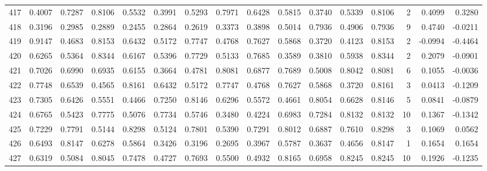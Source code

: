 \begin{tabular}{lrrrrrrrrrrrrrrr}
417 &      0.4007 &  0.7287 &  0.8106 &  0.5532 &  0.3991 &  0.5293 &  0.7971 &  0.6428 &  0.5815 &  0.3740 &   0.5339 &     0.8106 &      2 &                    0.4099 &                     0.3280 \\
418 &      0.3196 &  0.2985 &  0.2889 &  0.2455 &  0.2864 &  0.2619 &  0.3373 &  0.3898 &  0.5014 &  0.7936 &   0.4906 &     0.7936 &      9 &                    0.4740 &                    -0.0211 \\
419 &      0.9147 &  0.4683 &  0.8153 &  0.6432 &  0.5172 &  0.7747 &  0.4768 &  0.7627 &  0.5868 &  0.3720 &   0.4123 &     0.8153 &      2 &                   -0.0994 &                    -0.4464 \\
420 &      0.6265 &  0.5364 &  0.8344 &  0.6167 &  0.5396 &  0.7729 &  0.5133 &  0.7685 &  0.3589 &  0.3810 &   0.5938 &     0.8344 &      2 &                    0.2079 &                    -0.0901 \\
421 &      0.7026 &  0.6990 &  0.6935 &  0.6155 &  0.3664 &  0.4781 &  0.8081 &  0.6877 &  0.7689 &  0.5008 &   0.8042 &     0.8081 &      6 &                    0.1055 &                    -0.0036 \\
422 &      0.7748 &  0.6539 &  0.4565 &  0.8161 &  0.6432 &  0.5172 &  0.7747 &  0.4768 &  0.7627 &  0.5868 &   0.3720 &     0.8161 &      3 &                    0.0413 &                    -0.1209 \\
423 &      0.7305 &  0.6426 &  0.5551 &  0.4466 &  0.7250 &  0.8146 &  0.6296 &  0.5572 &  0.4661 &  0.8054 &   0.6628 &     0.8146 &      5 &                    0.0841 &                    -0.0879 \\
424 &      0.6765 &  0.5423 &  0.7775 &  0.5076 &  0.7734 &  0.5746 &  0.3480 &  0.4224 &  0.6983 &  0.7284 &   0.8132 &     0.8132 &     10 &                    0.1367 &                    -0.1342 \\
425 &      0.7229 &  0.7791 &  0.5144 &  0.8298 &  0.5124 &  0.7801 &  0.5390 &  0.7291 &  0.8012 &  0.6887 &   0.7610 &     0.8298 &      3 &                    0.1069 &                     0.0562 \\
426 &      0.6493 &  0.8147 &  0.6278 &  0.5864 &  0.3426 &  0.3196 &  0.2695 &  0.3967 &  0.5787 &  0.3637 &   0.4656 &     0.8147 &      1 &                    0.1654 &                     0.1654 \\
427 &      0.6319 &  0.5084 &  0.8045 &  0.7478 &  0.4727 &  0.7693 &  0.5500 &  0.4932 &  0.8165 &  0.6958 &   0.8245 &     0.8245 &     10 &                    0.1926 &                    -0.1235 \\

\end{tabular}
